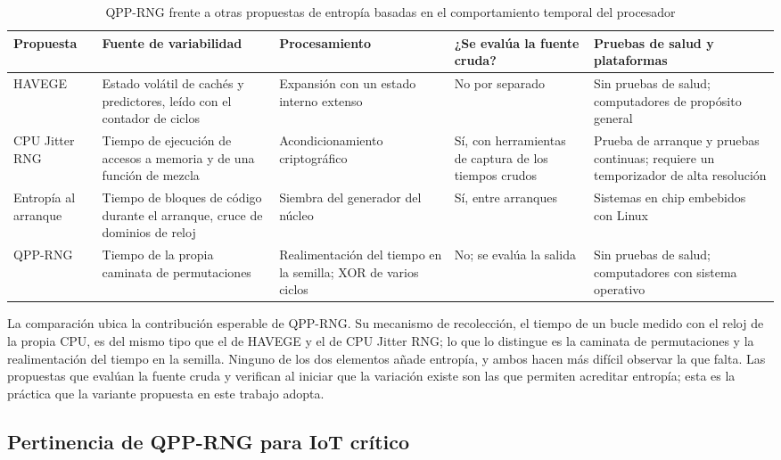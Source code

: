 \begin{table}[htbp]
\centering
\caption{QPP-RNG frente a otras propuestas de entropía basadas en el comportamiento temporal del procesador}
\label{tab:qpp_vs_otras}
\small
\begin{tabularx}{\textwidth}{@{}L{0.14\textwidth}L{0.21\textwidth}L{0.19\textwidth}L{0.17\textwidth}Y@{}}
\toprule
\textbf{Propuesta} & \textbf{Fuente de variabilidad} & \textbf{Procesamiento} & \textbf{¿Se evalúa la fuente cruda?} & \textbf{Pruebas de salud y plataformas} \\
\midrule
HAVEGE \cite{Seznec2003HAVEGE} & Estado volátil de cachés y predictores, leído con el contador de ciclos & Expansión con un estado interno extenso & No por separado & Sin pruebas de salud; computadores de propósito general \\
CPU Jitter RNG \cite{Muller2024JitterNPTRNG} & Tiempo de ejecución de accesos a memoria y de una función de mezcla & Acondicionamiento criptográfico & Sí, con herramientas de captura de los tiempos crudos & Prueba de arranque y pruebas continuas; requiere un temporizador de alta resolución \\
Entropía al arranque \cite{Mowery2013Entropics} & Tiempo de bloques de código durante el arranque, cruce de dominios de reloj & Siembra del generador del núcleo & Sí, entre arranques & Sistemas en chip embebidos con Linux \\
QPP-RNG \cite{Kuang2025IID-BasedJitter,Vrana2025RawEvaluation} & Tiempo de la propia caminata de permutaciones & Realimentación del tiempo en la semilla; XOR de varios ciclos & No; se evalúa la salida & Sin pruebas de salud; computadores con sistema operativo \\
\bottomrule
\end{tabularx}
\end{table}

La comparación ubica la contribución esperable de QPP-RNG. Su mecanismo de recolección, el tiempo de un bucle medido con el reloj de la propia CPU, es del mismo tipo que el de HAVEGE y el de CPU Jitter RNG; lo que lo distingue es la caminata de permutaciones y la realimentación del tiempo en la semilla. Ninguno de los dos elementos añade entropía, y ambos hacen más difícil observar la que falta. Las propuestas que evalúan la fuente cruda y verifican al iniciar que la variación existe son las que permiten acreditar entropía; esta es la práctica que la variante propuesta en este trabajo adopta.

\subsection{Pertinencia de QPP-RNG para IoT crítico}

